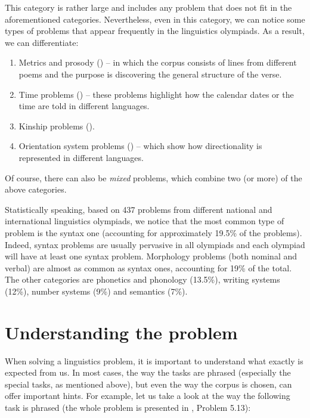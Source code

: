 \begin{enumerate}
This category is rather large and includes any problem that does not fit in the aforementioned categories. Nevertheless, even in this category, we can notice some types of problems that appear frequently in the linguistics olympiads. As a result, we can differentiate:
\begin{enumerate}[label = 7.\arabic*.]
    \item Metrics and prosody () – in which the corpus consists of lines from different poems and the purpose is discovering the general structure of the verse. 
	\item Time problems () – these problems highlight how the calendar dates or the time are told in different languages. 
	\item Kinship problems ().
	\item Orientation system problems () – which show how directionality is represented in different languages. 
\end{enumerate}
\end{enumerate}

Of course, there can also be \textit{mixed} problems, which combine two (or more) of the above categories.

Statistically speaking, based on 437 problems from different national and international linguistics olympiads, we notice that the most common type of problem is the syntax one (accounting for approximately 19.5\% of the problems). Indeed, syntax problems are usually pervasive in all olympiads and each olympiad will have at least one syntax problem. Morphology problems (both nominal and verbal) are almost as common as syntax ones, accounting for 19\% of the total. The other categories are phonetics and phonology (13.5\%), writing systems (12\%), number systems (9\%) and semantics (7\%).

\section{Understanding the problem}
When solving a linguistics problem, it is important to understand what exactly is expected from us. In most cases, the way the tasks are phrased (especially the special tasks, as mentioned above), but even the way the corpus is chosen, can offer important hints. For example, let us take a look at the way the following task is phrased (the whole problem is presented in , Problem 5.13):

